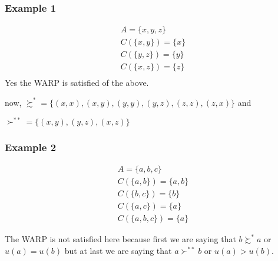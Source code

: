 \documentclass[12pt,a4paper,fleqn]{article}
\begin{document}
 \subsubsection*{Example 1} 
 \begin{align*}
    A= \{x,y,z\} \\
    C(\{x,y\})=\{x\} \\
    C(\{y,z\})=\{y\} \\
    C(\{x,z\})=\{z\} \\ 
\end{align*}
Yes the WARP is satisfied of the above.

now, \(\succsim^* =\{(x,x),(x,y),(y,y),(y,z),(z,z),(z,x)\} \)  and

\(\succ^{**} = \{(x,y),(y,z),(x,z)\} \)  

 \subsubsection*{Example 2} 

 \begin{align*}
  A= \{a,b,c\} \\
  C(\{a,b\})=\{a,b\} \\
  C(\{b,c\})=\{b\} \\
  C(\{a,c\})=\{a\} \\ 
  C(\{a,b,c\})=\{a\}
\end{align*}

The WARP is not satisfied here because first we are saying that \(b \succsim^* a\) or \(u(a)=u(b)\)  but at last we are saying that \(a \succ^{**} b\) or \(u(a) > u(b)\).
\end{document}
